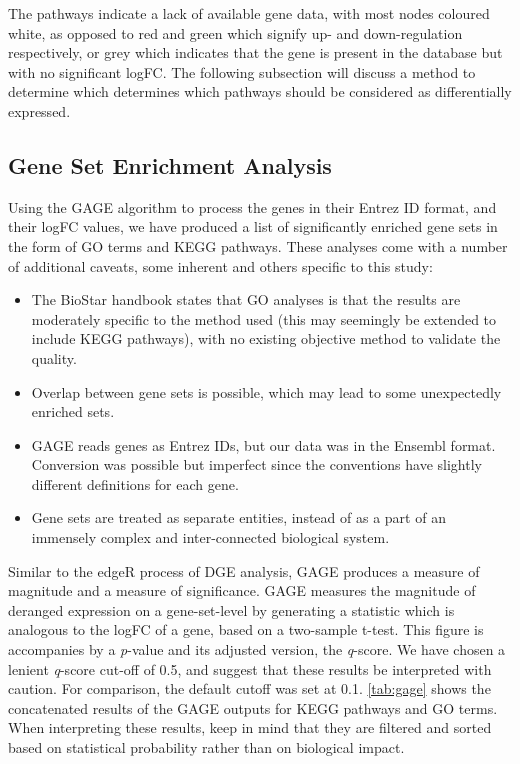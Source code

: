 The pathways indicate a lack of available gene data, with most nodes coloured white, as opposed to red and green which signify up- and down-regulation respectively, or grey which indicates that the gene is present in the database but with no significant \ac{logFC}. The following subsection will discuss a method to determine which determines which pathways should be considered as differentially expressed.

\subsection{Gene Set Enrichment Analysis}

Using the GAGE algorithm to process the genes in their Entrez ID format, and their \ac{logFC} values, we have produced a list of significantly enriched gene sets in the form of \ac{GO} terms and \ac{KEGG} pathways. These analyses come with a number of additional caveats, some inherent and others specific to this study:

\begin{itemize}
\item The BioStar handbook \citep{albert2020biostar} states that \ac{GO} analyses is that the results are moderately specific to the method used (this may seemingly be extended to include \ac{KEGG} pathways), with no existing objective method to validate the quality.
\item  Overlap between gene sets is possible, which may lead to some unexpectedly enriched sets. 
\item  GAGE reads genes as Entrez IDs, but our data was in the Ensembl format. Conversion was possible but imperfect since the conventions have slightly different definitions for each gene.
\item Gene sets are treated as separate entities, instead of as a part of an immensely complex and inter-connected biological system.
\end{itemize}

Similar to the edgeR process of \ac{DGE} analysis, GAGE produces a measure of magnitude and a measure of significance. GAGE measures the magnitude of deranged expression on a gene-set-level by generating a statistic which is analogous to the \ac{logFC} of a gene, based on a two-sample t-test. This figure is accompanies by a \textit{p}-value and its adjusted version, the \textit{q}-score. We have chosen a lenient \textit{q}-score cut-off of 0.5, and suggest that these results be interpreted with caution. For comparison, the default cutoff was set at 0.1. \autoref{tab:gage} shows the concatenated results of the GAGE outputs for \ac{KEGG} pathways and \ac{GO} terms. When interpreting these results, keep in mind that they are filtered and sorted based on statistical probability rather than on biological impact.

